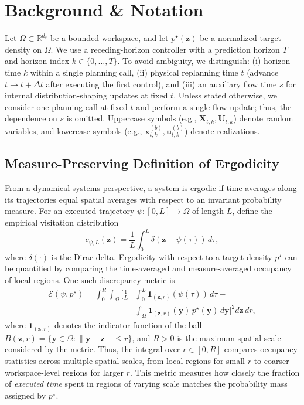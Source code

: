 \documentclass[conference]{IEEEtran}
\begin{document}
\section{Background \& Notation}
\label{sec:notation}

Let $\Omega\subset\mathbb{R}^{d_s}$ be a bounded workspace, and let $p^\star(\mathbf z)$ be a normalized target density on $\Omega$.
We use a receding-horizon controller with a prediction horizon $T$ and horizon index $k\in\{0,\dots,T\}$.
To avoid ambiguity, we distinguish: (i) horizon time $k$ within a single planning call, (ii) physical replanning time $t$ (advance $t\!\to\!t+\Delta t$ after executing the first control), and (iii) an auxiliary flow time $s$ for internal distribution-shaping updates at fixed $t$.
Unless stated otherwise, we consider one planning call at fixed $t$ and perform a single flow update; thus, the dependence on $s$ is omitted.
Uppercase symbols (e.g., $\mathbf{X}_{t,k},\mathbf{U}_{t,k}$) denote random variables, and lowercase symbols (e.g., $\mathbf{x}_{t,k}^{(b)},\mathbf{u}_{t,k}^{(b)}$) denote realizations.

\subsection{Measure-Preserving Definition of Ergodicity}\label{sec:ergodicity}
%
From a dynamical-systems perspective, a system is ergodic if time averages along its trajectories equal spatial averages with respect to an invariant probability measure.
For an executed trajectory $\psi:[0,L]\!\to\!\Omega$ of length $L$, define the empirical visitation distribution
%
\begin{equation}
    c_{\psi,L}(\mathbf{z})=\frac{1}{L}\int_0^L \delta(\mathbf{z}-\psi(\tau))\,d\tau,
\end{equation}
%
where \(\delta(\cdot)\) is the Dirac delta.
Ergodicity with respect to a target density $p^\star$ can be quantified by comparing the time-averaged and measure-averaged occupancy of local regions. One such discrepancy metric is
\begin{equation}\label{eq:ergodic_metric}
\begin{aligned}
    \mathcal{E}(\psi, p^\star) = \int_0^R\! \int_{\Omega} \Bigg[ \frac{1}{L} &\int_0^L \mathbf{1}_{(\mathbf{z}, r)}(\psi(\tau)) \, d\tau - \\
    &\int_{\Omega} \mathbf{1}_{(\mathbf{z}, r)}(\mathbf y) \, p^\star(\mathbf y) \, d\mathbf y \Bigg]^2 d\mathbf{z} \, dr,
\end{aligned}
\end{equation}
where $\mathbf{1}_{(\mathbf z,r)}$ denotes the indicator function of the ball
$B(\mathbf z,r)=\{\mathbf y\in\Omega:\|\mathbf y-\mathbf z\|\le r\}$,
and $R>0$ is the maximum spatial scale considered by the metric.
Thus, the integral over $r\in[0,R]$ compares occupancy statistics across multiple spatial scales, from local regions for small $r$ to coarser workspace-level regions for larger $r$.
This metric measures how closely the fraction of \emph{executed time} spent in regions of varying scale matches the probability mass assigned by $p^\star$.
\end{document}
